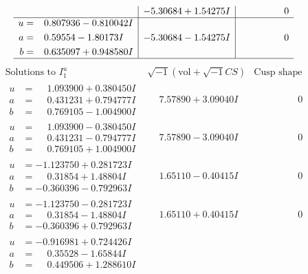 \documentclass[1p]{elsarticle_modified}
\theoremstyle{definition}
\newcommand{\I}{\sqrt{-1}}
\begin{document}
$$\begin{array}{c|c|c}
 & -5.30684 + 1.54275 I & \phantom{-0.000000 } 0 \\ \hline\begin{aligned}
u &= \phantom{-}0.807936 - 0.810042 I \\
a &= \phantom{-}0.59554 - 1.80173 I \\
b &= \phantom{-}0.635097 + 0.948580 I\end{aligned}
 & -5.30684 - 1.54275 I & \phantom{-0.000000 } 0\\
 \hline 
 \end{array}$$\newpage$$\begin{array}{c|c|c}  
\text{Solutions to }I^u_{1}& \I (\text{vol} + \sqrt{-1}CS) & \text{Cusp shape}\\
 \hline 
\begin{aligned}
u &= \phantom{-}1.093900 + 0.380450 I \\
a &= \phantom{-}0.431231 + 0.794777 I \\
b &= \phantom{-}0.769105 - 1.004900 I\end{aligned}
 & \phantom{-}7.57890 + 3.09040 I & \phantom{-0.000000 } 0 \\ \hline\begin{aligned}
u &= \phantom{-}1.093900 - 0.380450 I \\
a &= \phantom{-}0.431231 - 0.794777 I \\
b &= \phantom{-}0.769105 + 1.004900 I\end{aligned}
 & \phantom{-}7.57890 - 3.09040 I & \phantom{-0.000000 } 0 \\ \hline\begin{aligned}
u &= -1.123750 + 0.281723 I \\
a &= \phantom{-}0.31854 + 1.48804 I \\
b &= -0.360396 - 0.792963 I\end{aligned}
 & \phantom{-}1.65110 - 0.40415 I & \phantom{-0.000000 } 0 \\ \hline\begin{aligned}
u &= -1.123750 - 0.281723 I \\
a &= \phantom{-}0.31854 - 1.48804 I \\
b &= -0.360396 + 0.792963 I\end{aligned}
 & \phantom{-}1.65110 + 0.40415 I & \phantom{-0.000000 } 0 \\ \hline\begin{aligned}
u &= -0.916981 + 0.724426 I \\
a &= \phantom{-}0.35528 - 1.65844 I \\
b &= \phantom{-}0.449506 + 1.288610 I\end{aligned}

\end{array}$$
\end{document}
